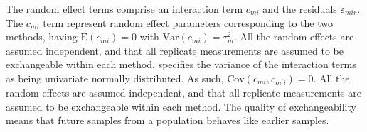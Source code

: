 \documentclass[12pt, a4paper]{report}
\theoremstyle{plain}
\theoremstyle{definition}
\theoremstyle{remark}
\begin{document}

%	
%	
%	
%
%	
%	
	
	
	
	The random effect terms comprise an interaction term $c_{mi}$ and the residuals $\varepsilon_{mir}$. The $c_{mi}$ term represent random effect parameters corresponding to the two methods, having $\mathrm{E}(c_{mi})= 0$ with $\mathrm{Var}(c_{mi})=\tau^2_m$. All the random effects are assumed independent, and that all replicate measurements are assumed to be exchangeable within each method.
%	
\citet{BXC2008} specifies the variance of the interaction terms as being univariate normally distributed. As such, $\mathrm{Cov}(c_{mi}, c_{m^\prime i})= 0.$ All the random effects are assumed independent, and that all replicate measurements are assumed to be exchangeable within each method.
The quality of exchangeability means that future samples from a population behaves like earlier samples.	
\end{document}
